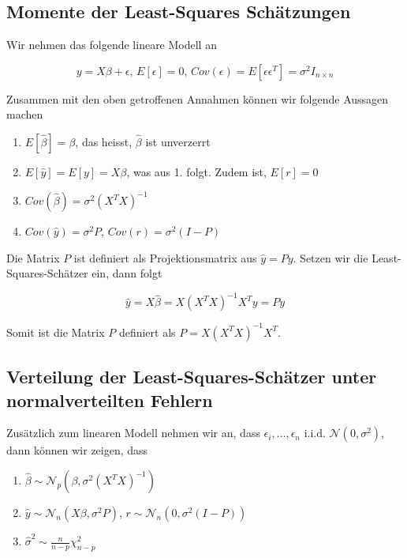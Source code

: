 \documentclass[]{book}
\providecommand{\tightlist}{%
  \setlength{\itemsep}{0pt}\setlength{\parskip}{0pt}}
\begin{document}
\subsection{Momente der Least-Squares
Schätzungen}\label{momente-der-least-squares-schatzungen}

Wir nehmen das folgende lineare Modell an

\begin{equation}y = X\beta + \epsilon \text{, } E\left[\epsilon \right] = 0 \text{, } Cov(\epsilon) = E\left[\epsilon\epsilon^T \right] = \sigma^2I_{n\times n}\end{equation}

Zusammen mit den oben getroffenen Annahmen können wir folgende Aussagen
machen

\begin{enumerate}
\def\labelenumi{\arabic{enumi}.}
\tightlist
\item
  \(E\left[\hat{\beta}\right] = \beta\), das heisst, \(\hat{\beta}\) ist
  unverzerrt
\item
  \(E\left[\hat{y}\right] = E\left[y\right] = X\beta\), was aus 1.
  folgt. Zudem ist, \(E\left[r\right] = 0\)
\item
  \(Cov(\hat{\beta}) = \sigma^2(X^TX)^{-1}\)
\item
  \(Cov(\hat{y}) = \sigma^2P\), \(Cov(r) = \sigma^2(I-P)\)
\end{enumerate}

Die Matrix \(P\) ist definiert als Projektionsmatrix aus
\(\hat{y} = Py\). Setzen wir die Least-Squares-Schätzer ein, dann folgt

\begin{equation}\hat{y} = X\hat{\beta} = X(X^TX)^{-1}X^Ty = Py\end{equation}

Somit ist die Matrix \(P\) definiert als \(P=X(X^TX)^{-1}X^T\).

\subsection{Verteilung der Least-Squares-Schätzer unter normalverteilten
Fehlern}\label{verteilung-der-least-squares-schatzer-unter-normalverteilten-fehlern}

Zusätzlich zum linearen Modell nehmen wir an, dass
\(\epsilon_i, \ldots, \epsilon_n \text{ i.i.d. } \mathcal{N}(0,\sigma^2)\),
dann können wir zeigen, dass

\begin{enumerate}
\def\labelenumi{\arabic{enumi}.}
\tightlist
\item
  \(\hat{\beta} \sim \mathcal{N}_p\left(\beta, \sigma^2(X^TX)^{-1}\right)\)
\item
  \(\hat{y} \sim \mathcal{N}_n\left(X\beta,\sigma^2P \right)\),
  \(r \sim \mathcal{N}_n\left(0,\sigma^2(I-P) \right)\)
\item
  \(\hat{\sigma}^2 \sim \frac{n}{n-p}\chi_{n-p}^2\)
\end{enumerate}
\end{document}
